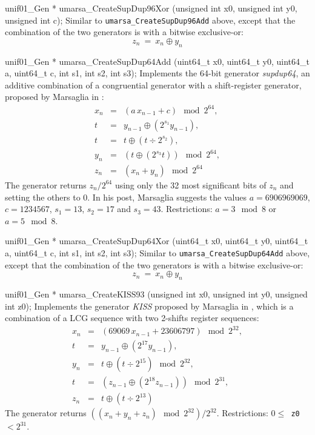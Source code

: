 unif01_Gen * umarsa_CreateSupDup96Xor (unsigned int x0, unsigned int y0,
                                       unsigned int c);
\endcode
 \tab Similar to {\tt umarsa\_CreateSupDup96Add} above, except that
  the combination of the two generators is with a bitwise exclusive-or:
  $$
   z_n \  = \ x_n \oplus  y_{n}
  $$
  \endtab
\code


unif01_Gen * umarsa_CreateSupDup64Add (uint64_t x0, uint64_t y0,
                                       uint64_t a, uint64_t c,
                                       int s1, int s2, int s3);
\endcode
 \tab Implements the 64-bit generator {\it supdup64}, an additive
  combination of
%
  a congruential generator with a shift-register generator, proposed by
  Marsaglia in \cite{rMAR02a}:
  \begin {eqnarray*}
   x_n &=& (a\, x_{n-1} + c) \mod 2^{64}, \\
   t &=& y_{n-1}\oplus \left(2^{s_1}y_{n-1}\right), \\
   t &=& t \oplus \left(t\div  2^{s_2}\right), \\
   y_{n} &=& \left(t \oplus \left(2^{s_3} t\right)\right) \mod 2^{64}, \\
   z_n &=& (x_n + y_{n}) \mod 2^{64}
  \end {eqnarray*}
   The generator returns  $z_n/2^{64}$ using only the 32 most significant
   bits of $z_n$ and setting the others to 0.
   In his post, Marsaglia suggests the values $a = 6906969069$,
   $c=1234567$, $s_1 = 13$, $s_2 = 17$ and $s_3 = 43$.
   Restrictions: $a = 3 \mod 8$ or $a = 5 \mod 8$.
  \endtab
\code


unif01_Gen * umarsa_CreateSupDup64Xor (uint64_t x0, uint64_t y0,
                                       uint64_t a, uint64_t c,
                                       int s1, int s2, int s3);
\endcode
 \tab Similar to {\tt umarsa\_CreateSupDup64Add} above, except that
  the combination of the two generators is with a bitwise exclusive-or:
  $$
   z_n \  = \ x_n \oplus  y_{n}
  $$
  \endtab
\code


unif01_Gen * umarsa_CreateKISS93 (unsigned int x0, unsigned int y0,
                                  unsigned int z0);
\endcode
 \tab Implements the generator {\it KISS}
 proposed by Marsaglia in \cite{rMAR93c},
%
   which is a combination of a LCG sequence with two 2-shifts register
   sequences:
  \begin {eqnarray*}
   x_n &=& (69069\, x_{n-1} + 23606797) \mod 2^{32}, \\
   t &=& y_{n-1}\oplus \left(2^{17} y_{n-1}\right), \\
   y_{n} &=& t \oplus \left(t\div 2^{15}\right) \mod 2^{32}, \\
   t &=& \left(z_{n-1}\oplus \left(2^{18} z_{n-1}\right)\right) \mod 2^{31},\\
   z_n &=& t \oplus \left(t \div 2^{13}\right)
  \end {eqnarray*}
   The generator returns
   $\left((x_n + y_n + z_n) \mod 2^{32}\right) / 2^{32}$.
   Restrictions: {\tt $0 \le$ z0 $< 2^{31}$}.
  \endtab
\code


